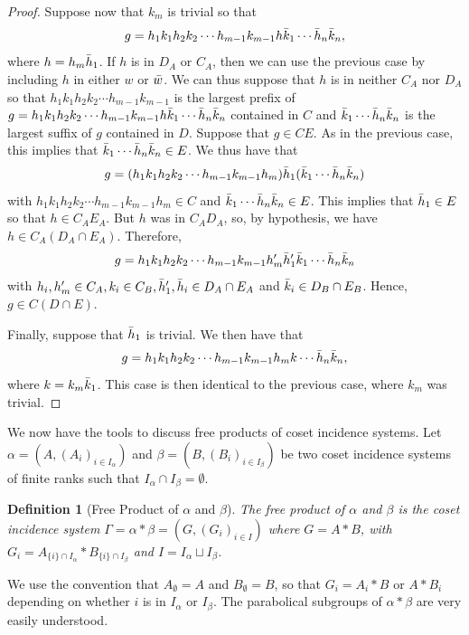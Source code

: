 \documentclass[11pt,letterpaper]{amsart}
\newtheorem{definition}[prop]{Definition}
\begin{document}
\begin{proof}
    Suppose now that $k_m$ is trivial so that $$g = h_1k_1h_2k_2 \cdots h_{m-1}k_{m-1} h  \Bar{k}_1 \cdots \Bar{h}_n\Bar{k}_n,$$ where $h = h_m \Bar{h}_1$. If $h$ is in $D_A$ or $C_A$, then we can use the previous case by including $h$ in either $w$ or $\Bar{w}$. We can thus suppose that $h$ is in neither $C_A$ nor $D_A$ so that $h_1k_1h_2k_2 \cdots h_{m-1}k_{m-1}$ is the largest prefix of $g= h_1k_1h_2k_2 \cdots h_{m-1}k_{m-1} h  \Bar{k}_1 \cdots \Bar{h}_n\Bar{k}_n$ contained in $C$ and $\Bar{k}_1 \cdots \Bar{h}_n\Bar{k}_n$ is the largest suffix of $g$ contained in $D$. Suppose that $g \in CE$. As in the previous case, this implies that $\Bar{k}_1 \cdots \Bar{h}_n\Bar{k}_n \in E$. We thus have that $$g = (h_1k_1h_2k_2 \cdots h_{m-1}k_{m-1} h_m)\Bar{h}_1 (\Bar{k}_1 \cdots \Bar{h}_n\Bar{k}_n)$$ with $h_1k_1h_2k_2 \cdots h_{m-1}k_{m-1} h_m \in C$ and $\Bar{k}_1 \cdots \Bar{h}_n\Bar{k}_n \in E$. This implies that $\Bar{h}_1 \in E$ so that $h \in C_AE_A$. But $h$ was in $C_AD_A$, so, by hypothesis, we have $h \in C_A (D_A \cap E_A)$. Therefore, $$g =  h_1k_1h_2k_2 \cdots h_{m-1}k_{m-1} h_m'\Bar{h}_1'  \Bar{k}_1 \cdots \Bar{h}_n\Bar{k}_n$$ with $h_i,h_m' \in C_A, k_i \in C_B, \Bar{h}_1',\Bar{h}_i \in D_A \cap E_A$ and $\Bar{k}_i \in D_B \cap E_B$. Hence, $g \in C(D\cap E)$.

    Finally, suppose that $\Bar{h}_1$ is trivial. We then have that $$g =  h_1k_1h_2k_2 \cdots h_{m-1}k_{m-1} h_m k  \cdots \Bar{h}_n\Bar{k}_n,$$ where $k = k_m \Bar{k}_1$. This case is then identical to the previous case, where $k_m$ was trivial.


\end{proof}


We now have the tools to discuss free products of coset incidence systems. Let $\alpha = (A, (A_i)_{i \in I_\alpha})$ and $ \beta =(B, (B_i)_{i \in I_\beta})$ be two coset incidence systems of finite ranks such that $I_\alpha \cap I_\beta = \emptyset$. 

\begin{definition}[Free Product of $\alpha$ and $\beta$]\label{def:freeProdCosetInc}
    The \textit{free product} of $\alpha$ and $\beta$ is the coset incidence system $\Gamma = \alpha * \beta = (G,(G_i)_{i \in I})$ where $G = A * B$, with $G_i = A_{\{i\} \cap I_\alpha} * B_{ \{i\} \cap I_\beta}$ and $I=I_\alpha \sqcup I_\beta$. 
\end{definition}

We use the convention that $A_\emptyset = A$ and $B_\emptyset = B$, so that $G_i = A_i *B$ or $A *B_i$ depending on whether $i$ is in $I_\alpha$ or $I_\beta$. The parabolical subgroups of $\alpha *\beta$ are very easily understood.
\end{document}

